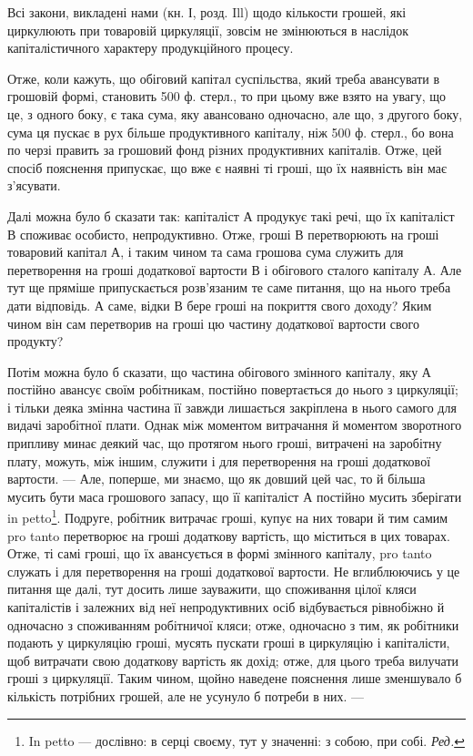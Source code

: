Всі закони, викладені нами (кн. І, розд. Ill) щодо кількости грошей,
які циркулюють при товаровій циркуляції, зовсім не змінюються в наслідок
капіталістичного характеру продукційного процесу.

Отже, коли кажуть, що обіговий капітал суспільства, який треба
авансувати в грошовій формі, становить 500 ф. стерл., то при цьому вже
взято на увагу, що це, з одного боку, є така сума, яку авансовано одночасно,
але що, з другого боку, сума ця пускає в рух більше продуктивного
капіталу, ніж 500 ф. стерл., бо вона по черзі править за грошовий
фонд різних продуктивних капіталів. Отже, цей спосіб пояснення
припускає, що вже є наявні ті гроші, що їх наявність він має з’ясувати.

Далі можна було б сказати так: капіталіст А продукує такі речі, що
їх капіталіст В споживає особисто, непродуктивно. Отже, гроші В перетворюють
на гроші товаровий капітал А, і таким чином та сама грошова
сума служить для перетворення на гроші додаткової вартости В і
обігового сталого капіталу А. Але тут ще пряміше припускається розв’язаним
те саме питання, що на нього треба дати відповідь. А саме, відки
В бере гроші на покриття свого доходу? Яким чином він сам перетворив
на гроші цю частину додаткової вартости свого продукту?

Потім можна було б сказати, що частина обігового змінного капіталу,
яку А постійно авансує своїм робітникам, постійно повертається до нього
з циркуляції; і тільки деяка змінна частина її завжди лишається закріплена
в нього самого для видачі заробітної плати. Однак між моментом
витрачання й моментом зворотного припливу минає деякий час, що
протягом нього гроші, витрачені на заробітну плату, можуть, між іншим,
служити і для перетворення на гроші додаткової вартости. — Але, поперше,
ми знаємо, що як довший цей час, то й більша мусить бути маса грошового
запасу, що її капіталіст А постійно мусить зберігати in petto\footnote*{
In petto — дослівно: в серці своєму, тут у значенні: з собою, при собі. \emph{Ред.}
}.
Подруге, робітник витрачає гроші, купує на них товари й тим самим
pro tanto перетворює на гроші додаткову вартість, що міститься в цих
товарах. Отже, ті самі гроші, що їх авансується в формі змінного капіталу,
pro tanto служать і для перетворення на гроші додаткової вартости.
Не вглиблюючись у це питання ще далі, тут досить лише зауважити, що
споживання цілої кляси капіталістів і залежних від неї непродуктивних
осіб відбувається рівнобіжно й одночасно з споживанням робітничої кляси;
отже, одночасно з тим, як робітники подають у циркуляцію гроші,
мусять пускати гроші в циркуляцію і капіталісти, щоб витрачати свою
додаткову вартість як дохід; отже, для цього треба вилучати гроші з
циркуляції. Таким чином, щойно наведене пояснення лише зменшувало б
кількість потрібних грошей, але не усунуло б потреби в них. —

